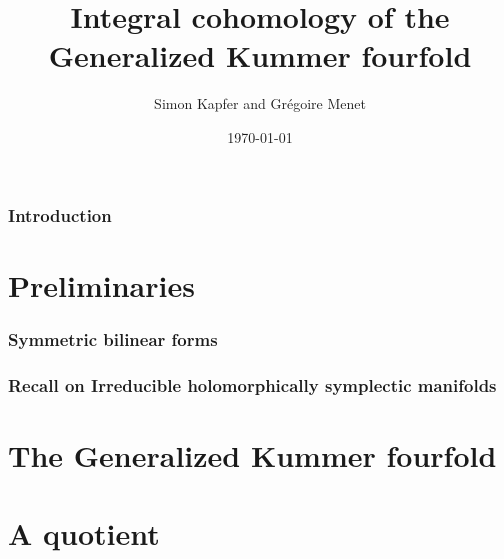 \documentclass[a4paper]{article}
\begin{document}
\title{\bf Integral cohomology of the Generalized Kummer fourfold}


\author{Simon Kapfer and Gr\'egoire Menet}


\date{\today}

\maketitle
\section{Introduction}
\part{Preliminaries}
\section{Symmetric bilinear forms}



\section{Recall on Irreducible holomorphically symplectic manifolds}


\part{The Generalized Kummer fourfold}\label{integralcohomology}




\part{A quotient}\label{quotient}



\end{document}
